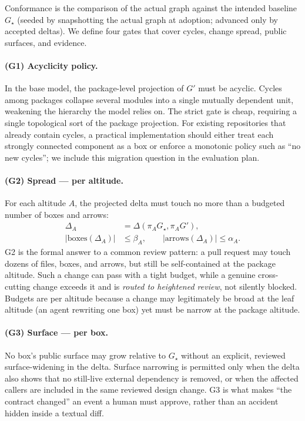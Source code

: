 \documentclass[sigconf,review,anonymous]{acmart}
\theoremstyle{plain}
\theoremstyle{definition}
\begin{document}
Conformance is the comparison of the actual graph against the intended baseline
$G_\star$ (seeded by snapshotting the actual graph at adoption; advanced only by
accepted deltas). We define four gates that cover cycles, change spread, public
surfaces, and evidence.

\paragraph{(G1) Acyclicity policy.}
In the base model, the package-level projection of $G'$ must be acyclic. Cycles
among packages collapse several modules into a single mutually dependent unit,
weakening the hierarchy the model relies on. The strict gate is cheap, requiring
a single topological sort of the package projection. For existing repositories
that already contain cycles, a practical implementation should either treat each
strongly connected component as a box or enforce a monotonic policy such as ``no
new cycles''; we include this migration question in the evaluation plan.

\paragraph{(G2) Spread --- per altitude.}
For each altitude $A$, the projected delta must touch no more than a budgeted
number of boxes and arrows:
\[
\begin{aligned}
\Delta_A &= \Delta(\pi_A G_\star, \pi_A G'),\\
|\text{boxes}(\Delta_A)| &\le \beta_A,\qquad
|\text{arrows}(\Delta_A)| \le \alpha_A .
\end{aligned}
\]
G2 is the formal answer to a common review pattern: a pull request may touch
dozens of files, boxes, and arrows, but still be self-contained at the package
altitude. Such a change can pass with a tight budget, while a genuine
cross-cutting change exceeds it and is \emph{routed to heightened review}, not
silently blocked. Budgets are per altitude because a change may legitimately be
broad at the leaf altitude (an agent rewriting one box) yet must be narrow at
the package altitude.

\paragraph{(G3) Surface --- per box.}
No box's public surface may grow relative to $G_\star$ without an explicit,
reviewed surface-widening in the delta. Surface narrowing is permitted only when
the delta also shows that no still-live external dependency is removed, or when
the affected callers are included in the same reviewed design change. G3 is what
makes ``the contract changed'' an event a human must approve, rather than an
accident hidden inside a textual diff.
\end{document}
